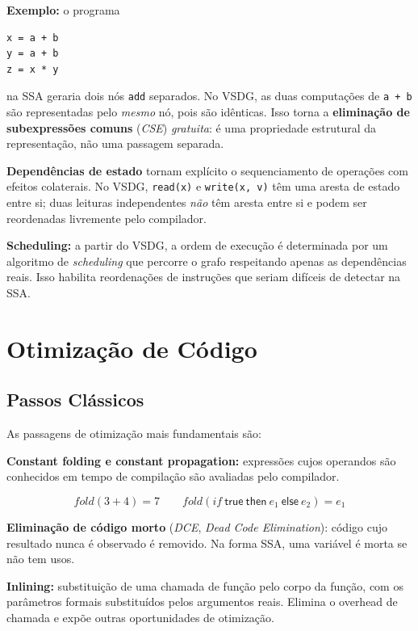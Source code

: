 \textbf{Exemplo:} o programa

\begin{verbatim}
x = a + b
y = a + b
z = x * y
\end{verbatim}

na SSA geraria dois nós \texttt{add} separados. No VSDG, as duas
computações de \texttt{a + b} são representadas pelo \emph{mesmo} nó,
pois são idênticas. Isso torna a \textbf{eliminação de subexpressões
comuns} (\emph{CSE}) \emph{gratuita}: é uma propriedade estrutural
da representação, não uma passagem separada.

\textbf{Dependências de estado} tornam explícito o sequenciamento de
operações com efeitos colaterais. No VSDG, \texttt{read(x)} e
\texttt{write(x,~v)} têm uma aresta de estado entre si; duas leituras
independentes \emph{não} têm aresta entre si e podem ser reordenadas
livremente pelo compilador.

\textbf{Scheduling:} a partir do VSDG, a ordem de execução é
determinada por um algoritmo de \emph{scheduling} que percorre o grafo
respeitando apenas as dependências reais. Isso habilita reordenações de
instruções que seriam difíceis de detectar na SSA.

\section{Otimização de Código}

\subsection{Passos Clássicos}

As passagens de otimização mais fundamentais são:

\textbf{Constant folding e constant propagation:} expressões cujos
operandos são conhecidos em tempo de compilação são avaliadas pelo
compilador.

\[
\mathit{fold}(3 + 4) = 7 \qquad
\mathit{fold}(\mathit{if}\ \mathsf{true}\ \mathsf{then}\ e_1\ \mathsf{else}\ e_2) = e_1
\]

\textbf{Eliminação de código morto} (\emph{DCE}, \emph{Dead Code
Elimination}): código cujo resultado nunca é observado é removido. Na
forma SSA, uma variável é morta se não tem usos.

\textbf{Inlining:} substituição de uma chamada de função pelo corpo da
função, com os parâmetros formais substituídos pelos argumentos reais.
Elimina o overhead de chamada e expõe outras oportunidades de
otimização.

